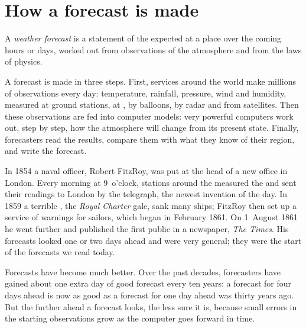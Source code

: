 \section{How a forecast is made}

\begin{definition}\label{def:g8:fronts-and-weather-maps:forecast}
A \emph{weather forecast} is a statement of the
 expected at a place over the coming hours or days, worked out
from observations of the atmosphere and from the laws of physics.
\end{definition}

A forecast is made in three steps. First,  services around the
world make millions of observations every day: temperature, rainfall,
pressure, wind and humidity, measured at ground stations, at , by
 balloons, by radar and from satellites. Then these observations
are fed into computer models: very powerful computers work out, step by
step, how the atmosphere will change from its present state. Finally,
forecasters read the results, compare them with what they know of their
region, and write the forecast.

\begin{history}
In 1854 a naval officer, Robert FitzRoy, was put at the head of a new
 office in London. Every morning at 9~o'clock, stations around the
 measured the  and sent their readings to London by the
telegraph, the newest invention of the day. In 1859 a terrible , the
\emph{Royal Charter} gale, sank many ships; FitzRoy then set up a service
of  warnings for sailors, which began in February 1861. On
1~August 1861 he went further and published the first public  in a newspaper, \emph{The Times}. His forecasts looked one or two
days ahead and were very general; they were the start of the forecasts we
read today.
\end{history}

Forecasts have become much better. Over the past decades, forecasters
have gained about one extra day of good forecast every ten years: a
forecast for four days ahead is now as good as a forecast for one day
ahead was thirty years ago. But the further ahead a forecast looks, the
less sure it is, because small errors in the starting observations
grow as the computer goes forward in time.

